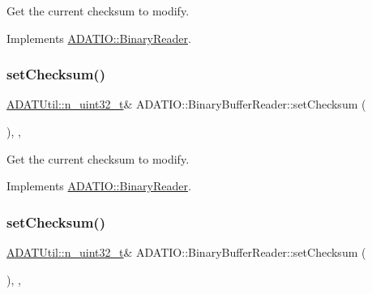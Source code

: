 Get the current checksum to modify. 



Implements \mbox{\hyperlink{classADATIO_1_1BinaryReader_a33d291f073bf2e1f71f6bdbe40ce343a}{A\+D\+A\+T\+I\+O\+::\+Binary\+Reader}}.

\mbox{\label{classADATIO_1_1BinaryBufferReader_a3976e5ece3392d04158307f864a84bb7}} 
\subsubsection{\texorpdfstring{setChecksum()}{setChecksum()}\hspace{0.1cm}{\footnotesize\ttfamily [2/3]}}
{\footnotesize\ttfamily \mbox{\hyperlink{namespaceADATUtil_ad945a8afa4db2d1f89b731964adae97e}{A\+D\+A\+T\+Util\+::n\+\_\+uint32\+\_\+t}}\& A\+D\+A\+T\+I\+O\+::\+Binary\+Buffer\+Reader\+::set\+Checksum (\begin{DoxyParamCaption}{ }\end{DoxyParamCaption})\hspace{0.3cm}{\ttfamily [inline]}, {\ttfamily [protected]}, {\ttfamily [virtual]}}



Get the current checksum to modify. 



Implements \mbox{\hyperlink{classADATIO_1_1BinaryReader_a33d291f073bf2e1f71f6bdbe40ce343a}{A\+D\+A\+T\+I\+O\+::\+Binary\+Reader}}.

\mbox{\label{classADATIO_1_1BinaryBufferReader_a3976e5ece3392d04158307f864a84bb7}} 
\subsubsection{\texorpdfstring{setChecksum()}{setChecksum()}\hspace{0.1cm}{\footnotesize\ttfamily [3/3]}}
{\footnotesize\ttfamily \mbox{\hyperlink{namespaceADATUtil_ad945a8afa4db2d1f89b731964adae97e}{A\+D\+A\+T\+Util\+::n\+\_\+uint32\+\_\+t}}\& A\+D\+A\+T\+I\+O\+::\+Binary\+Buffer\+Reader\+::set\+Checksum (\begin{DoxyParamCaption}{ }\end{DoxyParamCaption})\hspace{0.3cm}{\ttfamily [inline]}, {\ttfamily [protected]}, {\ttfamily [virtual]}}



